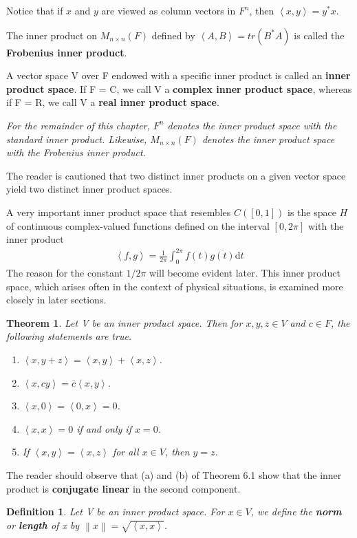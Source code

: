 \documentclass{article}
\newcommand{\norm}[1]{\left\lVert#1\right\rVert}
\newcommand{\bd}[1]{\textbf{#1}}
\newcommand{\ip}[1]{\left\langle {#1}\right\rangle} %
\theoremstyle{plain}
\newtheorem{theorem}{Theorem}[section]
\newtheorem*{definition1}{Definition}
\theoremstyle{plain} %
\begin{document}
Notice that if $x$ and $y$ are viewed as column vectors in $F^n$, then $\ip{x, y}=y^*x$.

The inner product on $M_{n\times n}(F)$ defined by $\ip{A, B}=tr(B^*A)$ is called the \bd{Frobenius inner product}.

A vector space V over F endowed with a specific inner product is called an \bd{inner product space}. If F = C, we call V a \bd{complex inner product
space}, whereas if F = R, we call V a \bd{real inner product space}.

\textit{For the remainder of this chapter, $F^n$ denotes the inner product space with the standard inner product. Likewise, $M_{n\times n}(F)$ denotes the inner product space with the Frobenius inner product.}

The reader is cautioned that two distinct inner products on a given vector space yield two distinct inner product spaces.

A very important inner product space that resembles $C([0, 1])$ is the space
$H$ of continuous complex-valued  functions defined on the interval $[0, 2\pi]$ with the inner product
\begin{align*}
  \ip{f, g}=\frac{1}{2\pi}\int_0^{2\pi}f(t)\overline{g(t)}\mathrm dt
\end{align*}
The reason for the constant $1/2\pi$ will become evident later. This inner product space, which arises often in the context of physical situations, is examined more closely in later sections.

\begin{theorem}
  Let V be an inner product space. Then for $x, y, z \in V$ and $c \in F$, the following statements are true.
  \begin{enumerate}[label=(\alph*)]
    \item $\ip{x, y+z}=\ip{x, y}+\ip {x, z}$.
    \item $\ip {x, cy}=\overline{c}\ip {x, y}$.
    \item $\ip {x, 0}=\ip {0, x} = 0$.
    \item $\ip {x, x}=0$ if and only if $x=0$.
    \item If $\ip{x, y}=\ip{x, z}$ for all $x\in V$, then $y=z$.
  \end{enumerate}
\end{theorem}

The reader should observe that (a) and (b) of Theorem 6.1 show that the inner product is \bd{conjugate linear} in the second component.

\begin{definition1}
  Let V be an inner product space. For $x \in V$, we define the \bd{norm} or \bd{length} of x by $\norm{x} = \sqrt{\ip{x, x}}$.
\end{definition1}
\end{document}
